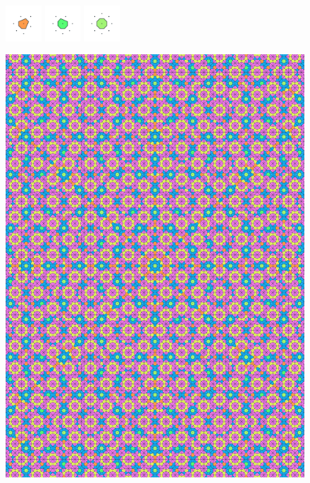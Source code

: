 \documentclass[text.tex]{subfiles}
\begin{document}
\begin{figure}[h!]
\includegraphics[width=0.12\textwidth]{img/results/circle8/circle8_170710_(1_1alpha_2)_005.pdf}
\includegraphics[width=0.12\textwidth]{img/results/circle8/circle8_170710_(1_1alpha_2)_006.pdf}
\includegraphics[width=0.12\textwidth]{img/results/circle8/circle8_170710_(1_1alpha_2)_007.pdf}
\end{figure}

\begin{figure}[h!]
\centering
\includegraphics[width=1\textwidth]{img/results/circle8/quasi_circle_170710_(1_1alpha_2).pdf}
\end{figure}
\end{document}
